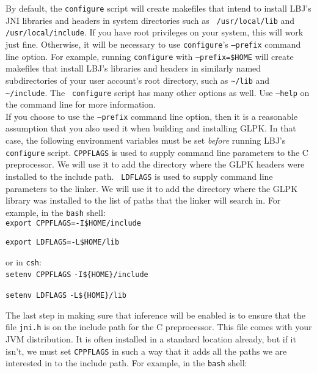 By default, the {\tt configure} script will create makefiles that intend to
install LBJ's JNI libraries and headers in system directories such as {\tt
/usr/local/lib} and {\tt /usr/local/include}.  If you have root privileges on
your system, this will work just fine.  Otherwise, it will be necessary to use
{\tt configure}'s {\tt --prefix} command line option.  For example, running
{\tt configure} with {\tt --prefix=\$HOME} will create makefiles that install
LBJ's libraries and headers in similarly named subdirectories of your user
account's root directory, such as \verb|~/lib| and \verb|~/include|.  The {\tt
configure} script has many other options as well.  Use {\tt --help} on the
command line for more information. \\

If you choose to use the {\tt --prefix} command line option, then it is a
reasonable assumption that you also used it when building and installing GLPK.
In that case, the following environment variables must be set \emph{before}
running LBJ's {\tt configure} script.  {\tt CPPFLAGS} is used to supply
command line parameters to the C preprocessor.  We will use it to add the
directory where the GLPK headers were installed to the include path.  {\tt
LDFLAGS} is used to supply command line parameters to the linker.  We will use
it to add the directory where the GLPK library was installed to the list of
paths that the linker will search in.  For example, in the {\tt bash} shell:
\\

\vspace{-.25cm}
{\tt export CPPFLAGS=-I\$HOME/include}

{\tt export LDFLAGS=-L\$HOME/lib} \\
\vspace{-.25cm}

\noindent
or in {\tt csh}: \\

\vspace{-.25cm}
{\tt setenv CPPFLAGS} \verb|-I${HOME}/include|

{\tt setenv LDFLAGS} \verb|-L${HOME}/lib| \\
\vspace{-.25cm}

The last step in making sure that inference will be enabled is to ensure that
the file {\tt jni.h} is on the include path for the C preprocessor.  This file
comes with your JVM distribution.  It is often installed in a standard
location already, but if it isn't, we must set {\tt CPPFLAGS} in such a way
that it adds all the paths we are interested in to the include path.  For
example, in the {\tt bash} shell: \\

